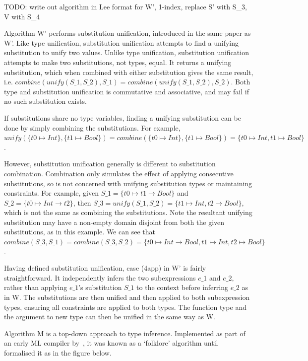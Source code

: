 \documentclass[a4paper,fleqn,twoside,12pt]{report}
\begin{document}
TODO: write out algorithm in Lee format for W’, 1-index, replace S’ with S\_3, V with S\_4

Algorithm W’ performs substitution unification, introduced in the same paper as W’. Like type unification, substitution unification attempts to find a unifying substitution to unify two values. Unlike type unification, substitution unification attempts to make two substitutions, not types, equal. It returns a unifying substitution, which when combined with either substitution gives the same result, i.e. $combine(unify(S\_1, S\_2), S\_1) = combine(unify(S\_1, S\_2), S\_2)$. Both type and substitution unification is commutative and associative, and may fail if no such substitution exists.

If substitutions share no type variables, finding a unifying substitution can be done by simply combining the substitutions. For example, $unify(\{ t0 \mapsto Int \}, \{ t1 \mapsto Bool \}) = combine(\{ t0 \mapsto Int \}, \{ t1 \mapsto Bool \}) = \{ t0 \mapsto Int, t1 \mapsto Bool \}$.

However, substitution unification generally is different to substitution combination. Combination only simulates the effect of applying consecutive substitutions, so is not concerned with unifying substitution types or maintaining constraints. For example, given $S\_1 = \{ t0 \mapsto t1 \rightarrow Bool \}$ and $S\_2 = \{ t0 \mapsto Int \rightarrow t2 \}$, then $S\_3 = unify(S\_1, S\_2) = \{ t1 \mapsto Int, t2 \mapsto Bool \}$, which is not the same as combining the substitutions. Note the resultant unifying substitution may have a non-empty domain disjoint from both the given substitutions, as in this example. We can see that $combine(S\_3, S\_1) = combine(S\_3, S\_2) = \{ t0 \mapsto Int \rightarrow Bool, t1 \mapsto Int, t2 \mapsto Bool \}$.

Having defined substitution unification, case (4app) in W’ is fairly straightforward. It independently infers the two subexpressions $e\_1$ and $e\_2$, rather than applying $e\_1$’s substitution $S\_1$ to the context before inferring $e\_2$ as in W. The substitutions are then unified and then applied to both subexpression types, ensuring all constraints are applied to both types. The function type and the argument to new type can then be unified in the same way as W.

Algorithm M is a top-down approach to type inference. Implemented as part of an early ML compiler by~\cite{ref32}, it was known as a ‘folklore’ algorithm until~\cite{ref33} formalised it as in the figure below.
\end{document}
